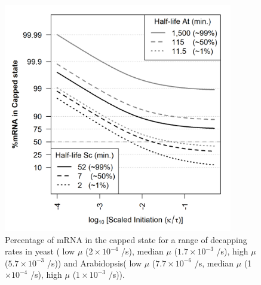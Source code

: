 \documentclass[review]{elsarticle}
\begin{document}
\begin{figure}[!ht]
\centering
\includegraphics[width=100mm]{Images/2023-07-13_logodds.png}
\caption{Percentage of mRNA in the capped state for a range of decapping rates in yeast ( low $\mu$ ($2\times 10^{-4}$ /s), median $\mu$ ($1.7\times 10^{-3}$ /s), high $\mu$ ($5.7\times 10^{-3}$ /s)) and Arabidopsis( low $\mu$ ($7.7\times 10^{-6}$ /s, median $\mu$ (1$\times 10^{-4}$ /s), high $\mu$ ($1\times 10^{-3}$ /s)). }
\end{figure}
\clearpage
\end{document}
